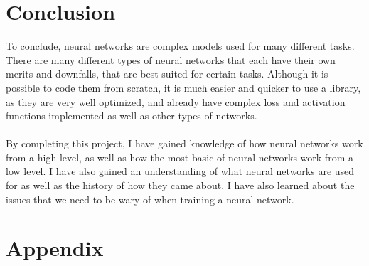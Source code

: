 \documentclass[titlepage]{article}
\begin{document}
\section{Conclusion}
To conclude, neural networks are complex models used for many different tasks. There are many different types of neural networks that each have their own merits and downfalls, that are best suited for certain tasks. Although it is possible to code them from scratch, it is much easier and quicker to use a library, as they are very well optimized, and already have complex loss and activation functions implemented as well as other types of networks.
\\\\
By completing this project, I have gained knowledge of how neural networks work from a high level, as well as how the most basic of neural networks work from a low level. I have also gained an understanding of what neural networks are used for as well as the history of how they came about. I have also learned about the issues that we need to be wary of when training a neural network.
\newpage
\section{Appendix}
\end{document}
